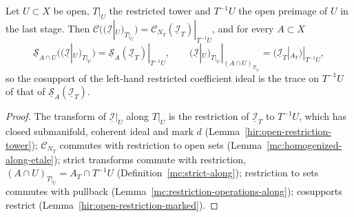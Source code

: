 \begin{lemma}
\label{mc:coefficient-restricted-tower}
\leanok
Let \(U\subset X\) be open, \(T|_U\) the restricted tower and \(T^{-1}U\) the open preimage of \(U\) in the last stage. Then
\(\mathcal C((\underline{\mathcal I}|_U)_{T|_U})=\mathcal C_{N_T}(\underline{\mathcal I}_T)|_{T^{-1}U}\), and for every \(A\subset X\)
\[\underline{\mathcal S}_{A\cap U}\bigl((\underline{\mathcal I}|_U)_{T|_U}\bigr)=\underline{\mathcal S}_A(\underline{\mathcal I}_T)|_{T^{-1}U},\qquad
(\underline{\mathcal I}|_U)_{T|_U}|_{(A\cap U)_{T|_U}}=(\underline{\mathcal I}_T|_{A_T})|_{T^{-1}U},\]
so the cosupport of the left-hand restricted coefficient ideal is the trace on \(T^{-1}U\) of that of \(\underline{\mathcal S}_A(\underline{\mathcal I}_T)\).
\end{lemma}
\begin{proof}
\leanok
The transform of \(\underline{\mathcal I}|_U\) along \(T|_U\) is the restriction of \(\underline{\mathcal I}_T\) to \(T^{-1}U\), which has closed submanifold, coherent ideal and mark
\(d\) (Lemma~\ref{hir:open-restriction-tower}); \(\mathcal C_{N_T}\) commutes with restriction to open sets (Lemma~\ref{mc:homogenized-along-etale}); strict transforms commute
with restriction, \((A\cap U)_{T|_U}=A_T\cap T^{-1}U\) (Definition~\ref{mc:strict-along}); restriction to sets commutes with pullback
(Lemma~\ref{mc:restriction-operations-along}); cosupports restrict (Lemma~\ref{hir:open-restriction-marked}).
\end{proof}


